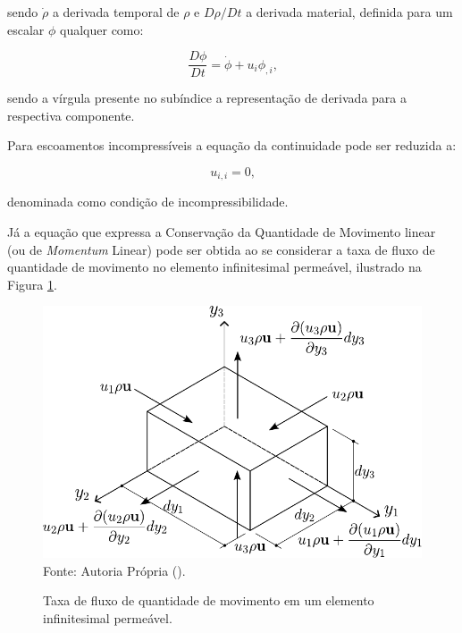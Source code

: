 \noindent sendo $\dot{\rho}$ a derivada temporal de $\rho$ e $D\rho/Dt$ a derivada material, definida para um escalar $\phi$ qualquer como:

\begin{equation}
    \frac{D\phi}{Dt}=\dot{\phi}+u_i\phi_{,i}\text{,}
\end{equation}





\noindent sendo a vírgula presente no subíndice a representação de derivada para a respectiva componente.

Para escoamentos incompressíveis a equação da continuidade pode ser reduzida a:

\begin{equation}
    u_{i,i}=0\text{,}\label{eq:incomp}
\end{equation}

\noindent denominada como condição de incompressibilidade.

Já a equação que expressa a Conservação da Quantidade de Movimento linear (ou de \textit{Momentum} Linear) pode ser obtida ao se considerar a taxa de fluxo de quantidade de movimento no elemento infinitesimal permeável, ilustrado na Figura \ref{fig:ConQtdMov}.

\begin{figure}[h!]
    \centering
    \caption{Taxa de fluxo de quantidade de movimento em um elemento infinitesimal permeável.}
    \includegraphics[width=.55\linewidth]{Figuras/ConQtdMov.pdf}
    \\Fonte: Autoria Própria (\the\year).
    \label{fig:ConQtdMov}
\end{figure}

